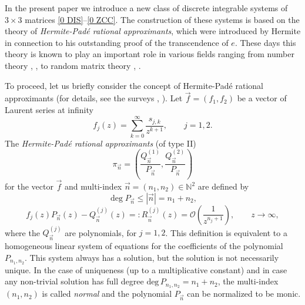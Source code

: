 \documentclass{amsart}
\theoremstyle{remark}
\numberwithin{equation}{section}
\begin{document}
\medskip

In the present paper we introduce a new
 class of discrete integrable systems of $3 \times 3$ matrices  \eqref{0 DIS}--\eqref{0 ZCC}. The construction  of these systems is based on the  theory of \textit{Hermite-Pad\'e rational approximants}, which were introduced by Hermite \cite{Her} in
connection to his outstanding proof of the transcendence of $e$. These days this theory is known to play an important role in various fields ranging from number theory \cite{Aper}, \cite{Apt2011}, \cite{vanA2001} to random matrix theory \cite{K2010}, \cite{AptKu}.

To proceed, let us briefly consider the concept of Hermite-Pad\'e rational approximants (for details, see the surveys \cite{Apt}, \cite{vanA1999}). Let $\vec{f} = (f_1,f_2)$ be a vector of Laurent series at infinity
\begin{equation}  \label{0 f}
   f_j(z) = \sum_{k=0}^\infty \frac{s_{j,k}}{z^{k+1}},\qquad j=1,2.
\end{equation}
The \textit{{Her\-mite-Pad\'e}{} rational approximants} (of type II)
\[  \pi_{\vec{n}} = \left( \frac{Q_{\vec{n}}^{(1)}}{P_{\vec{n}}},
    \frac{Q_{\vec{n}}^{(2)}}{P_{\vec{n}}} \right) \]
for the vector $\vec{f}$ and multi-index $\vec{n} = (n_1,  n_2) \in \mathbb{N}^2$
are defined by
\[  {\operatorname{deg}} P_{\vec{n}} \leq |\vec{n}| = n_1 + n_2, \]
\begin{equation}   \label{0 HP}
    f_j(z)P_{\vec{n}}(z) - Q_{\vec{n}}^{(j)}(z) =:
    R_{\vec{n}}^{(j)}(z) = \mathcal{O}\left(\frac{1}{z^{n_j+1}}\right), \qquad z \to \infty,
\end{equation}
where the $Q_{\vec{n}}^{(j)}$ are polynomials,
for $j=1, 2$.
This definition is equivalent to a homogeneous linear system of equations
for the coefficients of the polynomial $P_{n_1,n_2}$.
This system always has a solution, but the solution is not necessarily unique.
In the case of uniqueness (up to a multiplicative constant) and in
case any non-trivial solution has full degree $ \mbox{deg}\,P_{n_1,n_2}= n_1+n_2$,
the multi-index $(n_1,n_2)$ is called \textit{normal} and the polynomial $P_{\vec{n}}$ can
be normalized to be monic.
\end{document}
